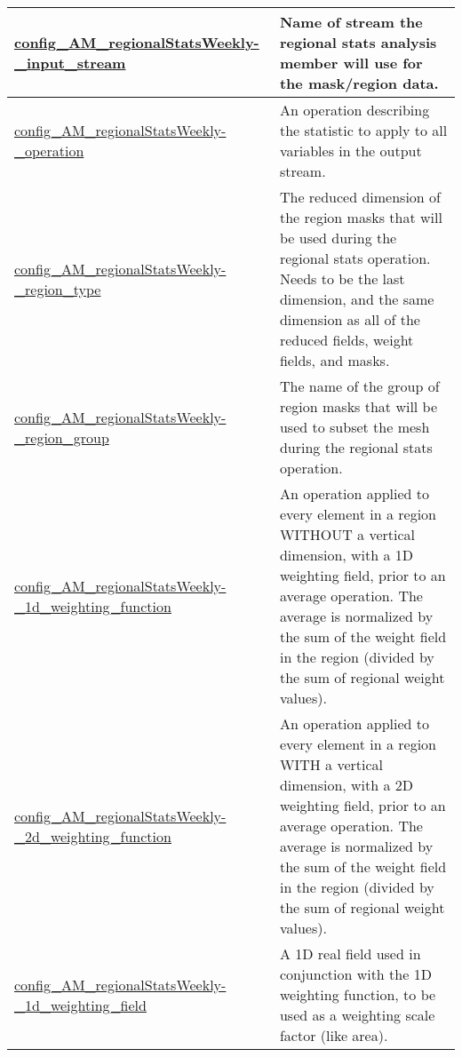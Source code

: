 {\begin{center}
\begin{longtable}{| p{2.0in} || p{4.0in} |}
    \hline
    \hyperref[subsec:nm_sec_config_AM_regionalStatsWeekly_input_stream]{config\_AM\_regionalStatsWeekly-}\hyperref[subsec:nm_sec_config_AM_regionalStatsWeekly_input_stream]{\_input\_stream}& Name of stream the regional stats analysis member will use for the mask/region data. \\
    \hline
    \hyperref[subsec:nm_sec_config_AM_regionalStatsWeekly_operation]{config\_AM\_regionalStatsWeekly-}\hyperref[subsec:nm_sec_config_AM_regionalStatsWeekly_operation]{\_operation}& An operation describing the statistic to apply to all variables in the output stream. \\
    \hline
    \hyperref[subsec:nm_sec_config_AM_regionalStatsWeekly_region_type]{config\_AM\_regionalStatsWeekly-}\hyperref[subsec:nm_sec_config_AM_regionalStatsWeekly_region_type]{\_region\_type}& The reduced dimension of the region masks that will be used during the regional stats operation. Needs to be the last dimension, and the same dimension as all of the reduced fields, weight fields, and masks. \\
    \hline
    \hyperref[subsec:nm_sec_config_AM_regionalStatsWeekly_region_group]{config\_AM\_regionalStatsWeekly-}\hyperref[subsec:nm_sec_config_AM_regionalStatsWeekly_region_group]{\_region\_group}& The name of the group of region masks that will be used to subset the mesh during the regional stats operation. \\
    \hline
    \hyperref[subsec:nm_sec_config_AM_regionalStatsWeekly_1d_weighting_function]{config\_AM\_regionalStatsWeekly-}\hyperref[subsec:nm_sec_config_AM_regionalStatsWeekly_1d_weighting_function]{\_1d\_weighting\_function}& An operation applied to every element in a region WITHOUT a vertical dimension, with a 1D weighting field, prior to an average operation. The average is normalized by the sum of the weight field in the region (divided by the sum of regional weight values). \\
    \hline
    \hyperref[subsec:nm_sec_config_AM_regionalStatsWeekly_2d_weighting_function]{config\_AM\_regionalStatsWeekly-}\hyperref[subsec:nm_sec_config_AM_regionalStatsWeekly_2d_weighting_function]{\_2d\_weighting\_function}& An operation applied to every element in a region WITH a vertical dimension, with a 2D weighting field, prior to an average operation. The average is normalized by the sum of the weight field in the region (divided by the sum of regional weight values). \\
    \hline
    \hyperref[subsec:nm_sec_config_AM_regionalStatsWeekly_1d_weighting_field]{config\_AM\_regionalStatsWeekly-}\hyperref[subsec:nm_sec_config_AM_regionalStatsWeekly_1d_weighting_field]{\_1d\_weighting\_field}& A 1D real field used in conjunction with the 1D weighting function, to be used as a weighting scale factor (like area). \\

\end{longtable}
\end{center}}
